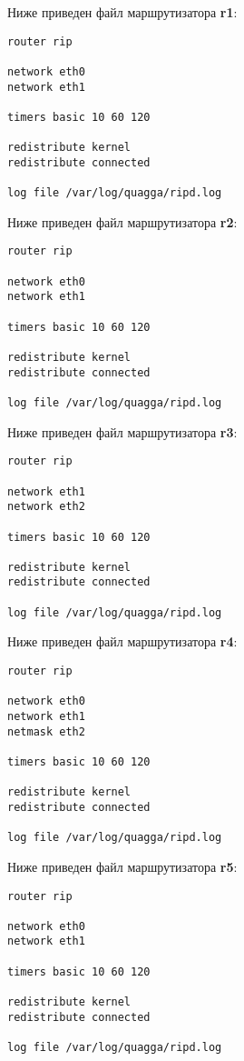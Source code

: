 \documentclass[a4paper,12pt]{article}
\begin{document}
Ниже приведен файл  маршрутизатора \textbf{r1}:

\begin{Verbatim}
router rip

network eth0
network eth1

timers basic 10 60 120

redistribute kernel
redistribute connected

log file /var/log/quagga/ripd.log
\end{Verbatim}

Ниже приведен файл  маршрутизатора \textbf{r2}:

\begin{Verbatim}
router rip

network eth0
network eth1

timers basic 10 60 120

redistribute kernel
redistribute connected

log file /var/log/quagga/ripd.log
\end{Verbatim}

Ниже приведен файл  маршрутизатора \textbf{r3}:

\begin{Verbatim}
router rip

network eth1
network eth2

timers basic 10 60 120

redistribute kernel
redistribute connected

log file /var/log/quagga/ripd.log
\end{Verbatim}

Ниже приведен файл  маршрутизатора \textbf{r4}:

\begin{Verbatim}
router rip

network eth0
network eth1
netmask eth2

timers basic 10 60 120

redistribute kernel
redistribute connected

log file /var/log/quagga/ripd.log
\end{Verbatim}

Ниже приведен файл  маршрутизатора \textbf{r5}:

\begin{Verbatim}
router rip

network eth0
network eth1

timers basic 10 60 120

redistribute kernel
redistribute connected

log file /var/log/quagga/ripd.log
\end{Verbatim}
\end{document}
